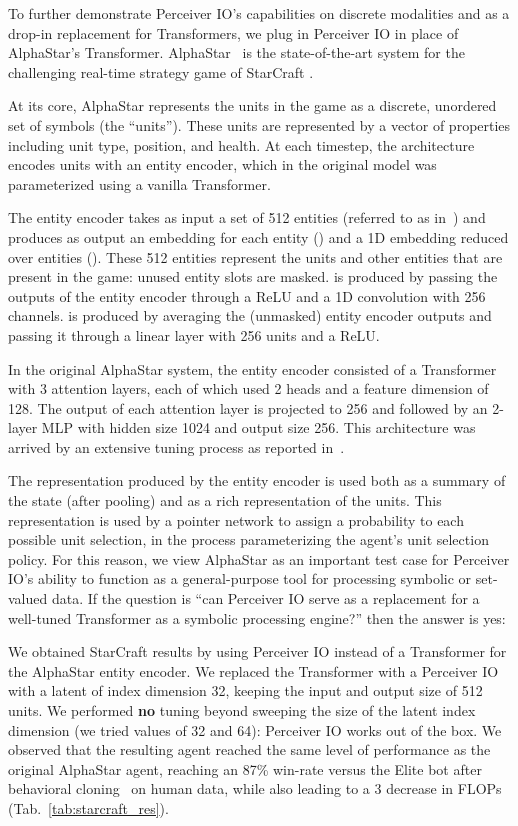 \documentclass{article} \usepackage{iclr2022_conference,times}
\newcommand{\ourmodel}{Perceiver IO\xspace}
\begin{document}
To further demonstrate \ourmodel{}'s capabilities on discrete modalities and as a drop-in replacement for Transformers, we plug in \ourmodel{} in place of AlphaStar's Transformer. AlphaStar~\citep{vinyals2019grandmaster} is the state-of-the-art system for the challenging real-time strategy game of StarCraft . 

At its core, AlphaStar represents the units in the game as a discrete, unordered set of symbols (the ``units''). These units are represented by a vector of properties including unit type, position, and health. At each timestep, the architecture encodes units with an entity encoder, which in the original model was parameterized using a vanilla Transformer.

The entity encoder takes as input a set of 512 entities (referred to as  in~\cite{vinyals2019grandmaster}) and produces as output an embedding for each entity () and a 1D embedding reduced over entities (). These 512 entities represent the units and other entities that are present in the game: unused entity slots are masked.  is produced by passing the outputs of the entity encoder through a ReLU and a 1D convolution with 256 channels.  is produced by averaging the (unmasked) entity encoder outputs and passing it through a linear layer with 256 units and a ReLU.

In the original AlphaStar system, the entity encoder consisted of a Transformer with 3 attention layers, each of which used 2 heads and a feature dimension of 128. The output of each attention layer is projected to 256 and followed by an 2-layer MLP with hidden size 1024 and output size 256. This architecture was arrived by an extensive tuning process as reported in~\cite{vinyals2019grandmaster}.

The representation produced by the entity encoder is used both as a summary of the state (after pooling) and as a rich representation of the units. This representation is used by a pointer network \citep{vinyals2015pointer} to assign a probability to each possible unit selection, in the process parameterizing the agent's unit selection policy. For this reason, we view AlphaStar as an important test case for \ourmodel{}'s ability to function as a general-purpose tool for processing symbolic or set-valued data. If the question is ``can \ourmodel{} serve as a replacement for a well-tuned Transformer as a symbolic processing engine?'' then the answer is yes:

We obtained StarCraft  results by using \ourmodel{} instead of a Transformer for the AlphaStar entity encoder. We replaced the Transformer with a \ourmodel{} with a latent of index dimension 32, keeping the input and output size of 512 units. We performed \textbf{no} tuning beyond sweeping the size of the latent index dimension (we tried values of 32 and 64): 
\ourmodel{} works out of the box. We observed that the resulting agent reached the same level of performance as the original AlphaStar agent, reaching an 87\% win-rate versus the Elite bot after behavioral cloning~\citep{pomerleau1989alvinn} on human data, while also leading to a 3 decrease in FLOPs (Tab.~\ref{tab:starcraft_res}).
\end{document}
